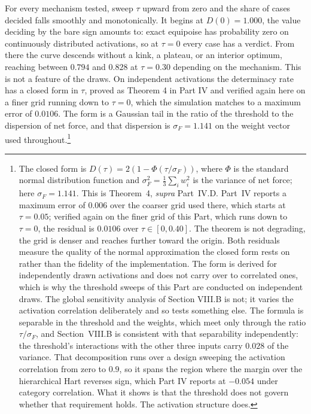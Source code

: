 For every mechanism tested, sweep $\tau$ upward from zero and the share of
cases decided falls smoothly and monotonically. It begins at
$D(0) = 1.000$, the value deciding by the bare sign amounts to:
exact equipoise has probability zero on continuously distributed
activations, so at $\tau = 0$ every case has a verdict. From there the
curve descends without a kink, a plateau, or an interior optimum,
reaching between $0.794$ and $0.828$ at $\tau = 0.30$ depending on the
mechanism. This is not a feature of the draws. On independent activations the determinacy
rate has a closed form in $\tau$, proved as Theorem 4 in Part IV and verified
again here on a finer grid running down to $\tau = 0$, which the simulation
matches to a maximum error of $0.0106$. The form is a Gaussian tail in
the ratio of the threshold to the dispersion of net force, and that
dispersion is $\sigma_F = 1.141$ on the weight vector used
throughout.\footnote{The closed form is
$D(\tau) = 2\left(1 - \Phi(\tau/\sigma_F)\right)$, where $\Phi$ is the
standard normal distribution function and $\sigma_F^2 = \frac{1}{3}\sum_i
w_i^2$ is the variance of net force; here $\sigma_F = 1.141$. This is Theorem~4, \textit{supra} Part~IV.D. Part~IV reports a maximum
error of $0.006$ over the coarser grid used there, which starts at $\tau =
0.05$; verified again on the finer grid of this Part, which runs down to
$\tau = 0$, the residual is $0.0106$ over $\tau \in [0, 0.40]$. The theorem is not degrading, the grid is denser and reaches further toward
the origin. Both residuals measure the quality of the normal approximation the
closed form rests on rather than the fidelity of the implementation. The form
is derived for independently drawn activations and does not carry over to
correlated ones, which is why the threshold sweeps of this Part are conducted
on independent draws. The global sensitivity analysis of Section VIII.B is
not; it varies the activation correlation deliberately and so tests something
else. The formula is separable in the threshold and the weights, which meet
only through the ratio $\tau/\sigma_F$, and Section~VIII.B is consistent with
that separability
independently: the threshold's interactions with the other three inputs carry $0.028$ of the
variance. That decomposition runs over a design sweeping the activation
correlation from zero to $0.9$, so it spans the region where the margin over
the hierarchical Hart reverses sign, which Part IV reports at $-0.054$ under
category correlation. What it shows is that the threshold does not govern
whether that requirement holds. The activation structure does.}


